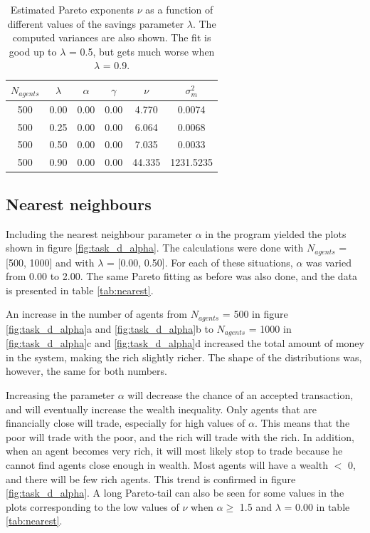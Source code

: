 \documentclass[11pt,a4paper,titlepage]{article}
\begin{document}
\begin{table}[ht!]
\centering
\caption{Estimated Pareto exponents $\nu$ as a function of different values of the savings parameter $\lambda$. The computed variances are also shown. The fit is good up to $\lambda$ = 0.5, but gets much worse when $\lambda$ = 0.9. } \label{tab:savings}
\begin{tabular}{| c | c | c | c | c | c |} \hline
\textbf{$N_{agents}$} & $\lambda$ & $\alpha$ & $\gamma$ &  $\nu$ & $\sigma^2_m$\\ \hline
500 & 0.00 & 0.00 & 0.00 & 4.770 & 0.0074\\ \hline
500 & 0.25 & 0.00 & 0.00 & 6.064 & 0.0068\\ \hline
500 & 0.50 & 0.00 & 0.00 & 7.035 & 0.0033\\ \hline
500 & 0.90 & 0.00 & 0.00 & 44.335 & 1231.5235\\ \hline
\end{tabular}
\end{table}


\subsection{Nearest neighbours}
Including the nearest neighbour parameter $\alpha$ in the program yielded the plots shown in figure \ref{fig:task_d_alpha}. The calculations were done with $N_{agents}$ = [500, 1000] and with $\lambda$ = [0.00, 0.50]. For each of these situations, $\alpha$ was varied from 0.00 to 2.00. The same Pareto fitting as before was also done, and the data is presented in table \ref{tab:nearest}.

An increase in the number of agents from $N_{agents}$ = 500 in figure \ref{fig:task_d_alpha}a and \ref{fig:task_d_alpha}b to $N_{agents}$ = 1000 in \ref{fig:task_d_alpha}c and \ref{fig:task_d_alpha}d increased the total amount of money in the system, making the rich slightly richer. The shape of the distributions was, however, the same for both numbers. 

Increasing the parameter $\alpha$ will decrease the chance of an accepted transaction, and will eventually increase the wealth inequality. Only agents that are financially close will trade, especially for high values of $\alpha$. This means that the poor will trade with the poor, and the rich will trade with the rich. In addition, when an agent becomes very rich, it will most likely stop to trade because he cannot find agents close enough in wealth. 
Most agents will have a wealth $<$ 0, and there will be few rich agents.
This trend is confirmed in figure \ref{fig:task_d_alpha}. A long Pareto-tail can also be seen for some values in the plots corresponding to the low values of $\nu$ when $\alpha \geq$ 1.5 and $\lambda$ = 0.00 in table \ref{tab:nearest}.
\end{document}
